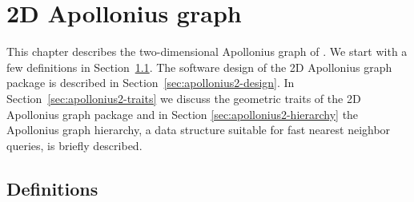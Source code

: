 
\chapter{2D Apollonius graph}
\label{chapter-apollonius2}

\minitoc

This chapter describes the two-dimensional Apollonius graph
of \cgal. We start with a few definitions in 
Section~\ref{sec:apollonius2-definitions}.
The software design of the 2D Apollonius graph package is described 
in Section~\ref{sec:apollonius2-design}.
In Section~\ref{sec:apollonius2-traits} we discuss the geometric
traits of the 2D Apollonius graph package and in Section
\ref{sec:apollonius2-hierarchy} the Apollonius graph hierarchy, a data
structure suitable for fast nearest neighbor queries, is briefly
described.


\section{Definitions}
\label{sec:apollonius2-definitions}

